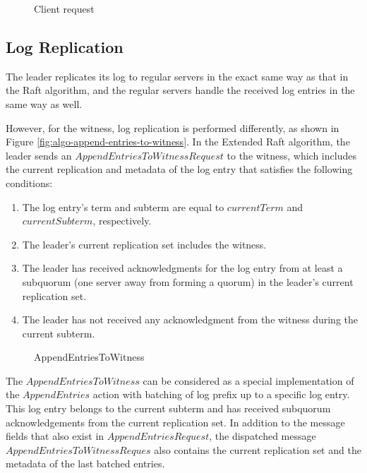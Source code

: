\begin{figure}
    \begin{framed}
        
    \end{framed}
    \caption{Client request}
    \label{fig:client-request}
\end{figure}

\subsection{Log Replication} \label{subsection:log-replication}
The leader replicates its log to regular servers in the exact same way as that in the Raft algorithm, and the regular servers handle the received log entries in the same way as well.

However, for the witness, log replication is performed differently, as shown in Figure \ref{fig:algo-append-entries-to-witness}. In the Extended Raft algorithm, the leader sends an $AppendEntriesToWitnessRequest$ to the witness, which includes the current replication and metadata of the log entry that satisfies the following conditions:
\begin{enumerate} 
    \item\label{cond:in-subterm} The log entry's term and subterm are equal to $currentTerm$ and $currentSubterm$, respectively. 
    \item The leader's current replication set includes the witness. 
    \item The leader has received acknowledgments for the log entry from at least a subquorum (one server away from forming a quorum) in the leader's current replication set. 
    \item\label{condition:first-in-subterm} The leader has not received any acknowledgment from the witness during the current subterm. 
\end{enumerate}

\begin{figure}[htbp]
    \begin{framed}
        
    \end{framed}
    
    \caption{AppendEntriesToWitness}
    \label{fig:append-entries-to-witness}
\end{figure}

The $AppendEntriesToWitness$ can be considered as a special implementation of the $AppendEntries$ action with batching of log prefix up to a specific log entry. This log entry belongs to the current subterm and has received subquorum acknowledgements from the current replication set. In addition to the message fields that also exist in $AppendEntriesRequest$, the dispatched message $AppendEntriesToWitnessReques$ also contains the current replication set and the metadata of the last batched entries.

